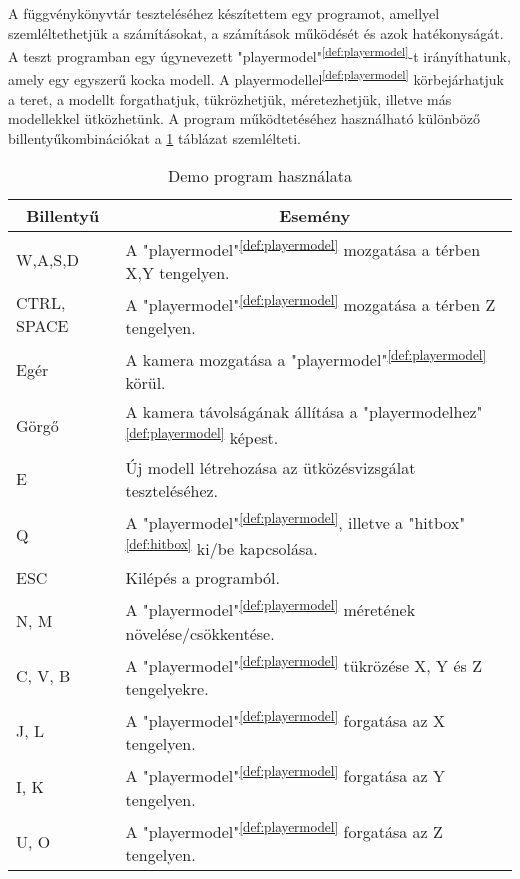 

A függvénykönyvtár teszteléséhez készítettem egy programot, amellyel szemléltethetjük a számításokat, a számítások működését és azok hatékonyságát. A teszt programban egy úgynevezett "playermodel"\textsuperscript{\ref{def:playermodel}}-t irányíthatunk, amely egy egyszerű kocka modell. A playermodellel\textsuperscript{\ref{def:playermodel}} körbejárhatjuk a teret, a modellt forgathatjuk, tükrözhetjük, méretezhetjük, illetve más modellekkel ütközhetünk. A program működtetéséhez használható különböző billentyűkombinációkat a \ref{tab:demo} táblázat szemlélteti.
\begin{table}[h]
	\centering
	\begin{tabular}{|l|l|}
		\hline
		\multicolumn{1}{|c|}{\textbf{Billentyű}} & \multicolumn{1}{c|}{\textbf{Esemény}}\\
		\hline
		 W,A,S,D & {A "playermodel"\textsuperscript{\ref{def:playermodel}} mozgatása a térben X,Y tengelyen.} \\\hline
		 CTRL, SPACE & A "playermodel"\textsuperscript{\ref{def:playermodel}} mozgatása a térben Z tengelyen. \\\hline
		 Egér & A kamera mozgatása a "playermodel"\textsuperscript{\ref{def:playermodel}} körül. \\\hline
		 Görgő & A kamera távolságának állítása a "playermodelhez"\textsuperscript{\ref{def:playermodel}} képest. \\\hline
		 E & Új modell létrehozása az ütközésvizsgálat teszteléséhez. \\\hline
		 Q & A "playermodel"\textsuperscript{\ref{def:playermodel}}, illetve a "hitbox"\textsuperscript{\ref{def:hitbox}} ki/be kapcsolása. \\\hline
		 ESC & Kilépés a programból. \\\hline
		 N, M & A "playermodel"\textsuperscript{\ref{def:playermodel}} méretének növelése/csökkentése. \\\hline
		 C, V, B & A "playermodel"\textsuperscript{\ref{def:playermodel}} tükrözése X, Y és Z tengelyekre. \\\hline
		 J, L & A "playermodel"\textsuperscript{\ref{def:playermodel}} forgatása az X tengelyen. \\\hline
		 I, K & A "playermodel"\textsuperscript{\ref{def:playermodel}} forgatása az Y tengelyen. \\\hline
		 U, O & A "playermodel"\textsuperscript{\ref{def:playermodel}} forgatása az Z tengelyen. \\\hline
	\end{tabular}
	\caption{Demo program használata}
	\label{tab:demo}
\end{table}

\newpage